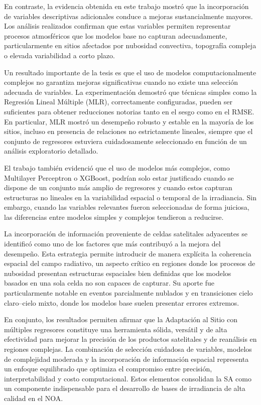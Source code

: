En contraste, la evidencia obtenida en este trabajo mostró que la incorporación de variables descriptivas adicionales conduce a mejoras sustancialmente mayores. Los análisis realizados confirman que estas variables permiten representar procesos atmosféricos que los modelos base no capturan adecuadamente, particularmente en sitios afectados por nubosidad convectiva, topografía compleja o elevada variabilidad a corto plazo.

Un resultado importante de la tesis es que el uso de modelos computacionalmente complejos no garantiza mejoras significativas cuando no existe una selección adecuada de variables. La experimentación demostró que técnicas simples como la Regresión Lineal Múltiple (MLR), correctamente configuradas, pueden ser suficientes para obtener reducciones notorias tanto en el sesgo como en el RMSE. En particular, MLR mostró un desempeño robusto y estable en la mayoría de los sitios, incluso en presencia de relaciones no estrictamente lineales, siempre que el conjunto de regresores estuviera cuidadosamente seleccionado en función de un análisis exploratorio detallado.

El trabajo también evidenció que el uso de modelos más complejos, como Multilayer Perceptron o XGBoost, podrían solo estar justificado cuando se dispone de un conjunto más amplio de regresores y cuando estos capturan estructuras no lineales en la variabilidad espacial o temporal de la irradiancia. Sin embargo, cuando las variables relevantes fueron seleccionadas de forma juiciosa, las diferencias entre modelos simples y complejos tendieron a reducirse.

La incorporación de información proveniente de celdas satelitales adyacentes se identificó como uno de los factores que más contribuyó a la mejora del desempeño. Esta estrategia permite introducir de manera explícita la coherencia espacial del campo radiativo, un aspecto crítico en regiones donde los procesos de nubosidad presentan estructuras espaciales bien definidas que los modelos basados en una sola celda no son capaces de capturar. Su aporte fue particularmente notable en eventos parcialmente nublados y en transiciones cielo claro–cielo mixto, donde los modelos base suelen presentar errores extremos.

En conjunto, los resultados permiten afirmar que la Adaptación al Sitio con múltiples regresores constituye una herramienta sólida, versátil y de alta efectividad para mejorar la precisión de los productos satelitales y de reanálisis en regiones complejas. La combinación de selección cuidadosa de variables, modelos de complejidad moderada y la incorporación de información espacial representa un enfoque equilibrado que optimiza el compromiso entre precisión, interpretabilidad y costo computacional. Estos elementos consolidan la SA como un componente indispensable para el desarrollo de bases de irradiancia de alta calidad en el NOA.



